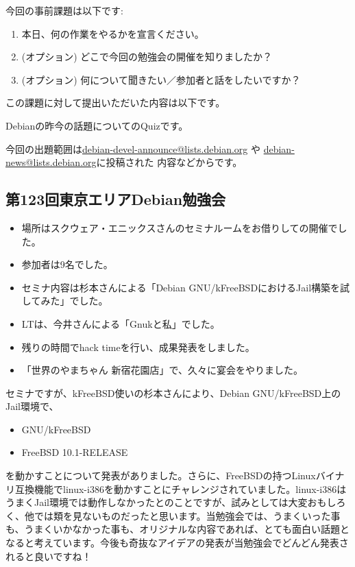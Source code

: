 \documentclass[mingoth,a4paper]{jsarticle}
\begin{document}

今回の事前課題は以下です:
\begin{enumerate}
\item 本日、何の作業をやるかを宣言ください。
\item (オプション) どこで今回の勉強会の開催を知りましたか？
\item (オプション) 何について聞きたい／参加者と話をしたいですか？
\end{enumerate}
この課題に対して提出いただいた内容は以下です。
\begin{multicols}{2}
{\small

}
\end{multicols}


 Debianの昨今の話題についてのQuizです。

今回の出題範囲は\url{debian-devel-announce@lists.debian.org} や \url{debian-news@lists.debian.org}に投稿された
内容などからです。

\begin{multicols}{2}

\end{multicols}


\subsection{第123回東京エリアDebian勉強会}

\begin{itemize}
\item 場所はスクウェア・エニックスさんのセミナルームをお借りしての開催でした。
\item 参加者は9名でした。
\item セミナ内容は杉本さんによる「Debian GNU/kFreeBSDにおけるJail構築を試してみた」でした。
\item LTは、今井さんによる「Gnukと私」でした。
\item 残りの時間でhack timeを行い、成果発表をしました。
\item 「世界のやまちゃん 新宿花園店」で、久々に宴会をやりました。
\end{itemize} 

 セミナですが、kFreeBSD使いの杉本さんにより、Debian GNU/kFreeBSD上のJail環境で、
\begin{itemize}
\item GNU/kFreeBSD
\item FreeBSD 10.1-RELEASE
\end{itemize}
を動かすことについて発表がありました。さらに、FreeBSDの持つLinuxバイナリ互換機能でlinux-i386を動かすことにチャレンジされていました。linux-i386はうまくJail環境では動作しなかったとのことですが、試みとしては大変おもしろく、他では類を見ないものだったと思います。当勉強会では、うまくいった事も、うまくいかなかった事も、オリジナルな内容であれば、とても面白い話題となると考えています。今後も奇抜なアイデアの発表が当勉強会でどんどん発表されると良いですね！
\end{document}

